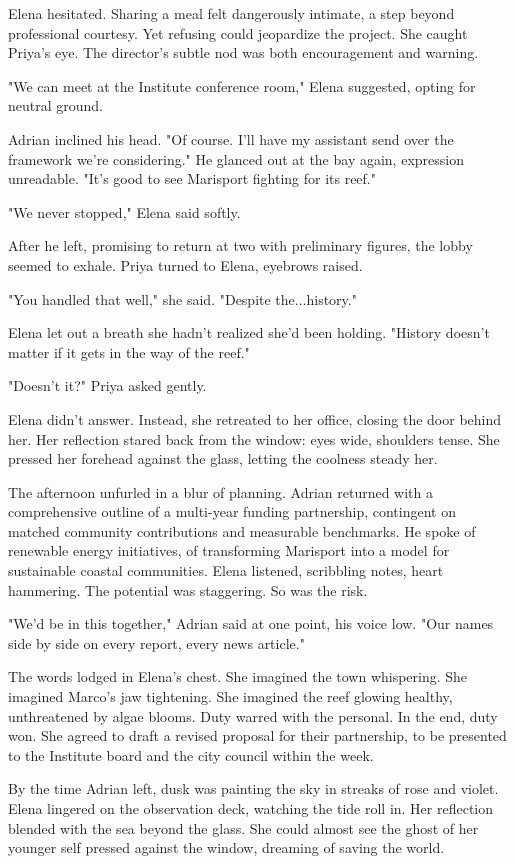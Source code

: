 Elena hesitated. Sharing a meal felt dangerously intimate, a step beyond professional courtesy. Yet refusing could jeopardize the project. She caught Priya's eye. The director's subtle nod was both encouragement and warning.

"We can meet at the Institute conference room," Elena suggested, opting for neutral ground.

Adrian inclined his head. "Of course. I'll have my assistant send over the framework we're considering." He glanced out at the bay again, expression unreadable. "It's good to see Marisport fighting for its reef."

"We never stopped," Elena said softly.

After he left, promising to return at two with preliminary figures, the lobby seemed to exhale. Priya turned to Elena, eyebrows raised.

"You handled that well," she said. "Despite the...history."

Elena let out a breath she hadn't realized she'd been holding. "History doesn't matter if it gets in the way of the reef."

"Doesn't it?" Priya asked gently.

Elena didn't answer. Instead, she retreated to her office, closing the door behind her. Her reflection stared back from the window: eyes wide, shoulders tense. She pressed her forehead against the glass, letting the coolness steady her.

The afternoon unfurled in a blur of planning. Adrian returned with a comprehensive outline of a multi-year funding partnership, contingent on matched community contributions and measurable benchmarks. He spoke of renewable energy initiatives, of transforming Marisport into a model for sustainable coastal communities. Elena listened, scribbling notes, heart hammering. The potential was staggering. So was the risk.

"We'd be in this together," Adrian said at one point, his voice low. "Our names side by side on every report, every news article."

The words lodged in Elena's chest. She imagined the town whispering. She imagined Marco's jaw tightening. She imagined the reef glowing healthy, unthreatened by algae blooms. Duty warred with the personal. In the end, duty won. She agreed to draft a revised proposal for their partnership, to be presented to the Institute board and the city council within the week.

By the time Adrian left, dusk was painting the sky in streaks of rose and violet. Elena lingered on the observation deck, watching the tide roll in. Her reflection blended with the sea beyond the glass. She could almost see the ghost of her younger self pressed against the window, dreaming of saving the world.

